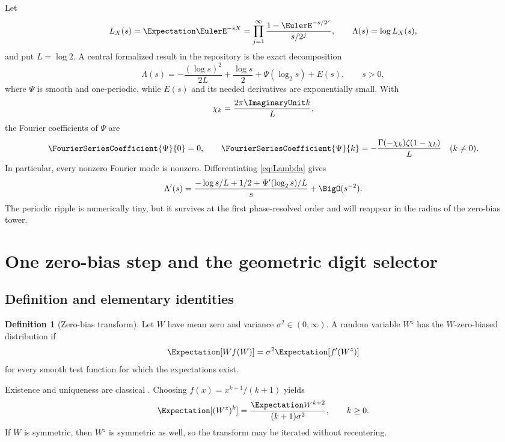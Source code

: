 \documentclass[11pt,oneside]{article}
\theoremstyle{definition}
\newtheorem{definition}[theorem]{Definition}
\theoremstyle{remark}
\begin{document}
Let
\begin{equation}
 L_X(s)=\Expectation\EulerE^{-sX}
 =\prod_{j=1}^{\infty}
   \frac{1-\EulerE^{-s/2^j}}{s/2^j},
 \qquad \Lambda(s)=\log L_X(s),                    \label{eq:LX}
\end{equation}
and put $L=\log2$.  A central formalized result in the repository is the exact
decomposition
\begin{equation}
 \Lambda(s)
 =-\frac{(\log s)^2}{2L}+\frac{\log s}{2}
   +\Psi(\log_2s)+E(s),\qquad s>0,                  \label{eq:Lambda}
\end{equation}
where $\Psi$ is smooth and one-periodic, while $E(s)$ and its needed
derivatives are exponentially small.  With
\begin{equation}
 \chi_k=\frac{2\pi\ImaginaryUnit k}{L},                        \label{eq:chi}
\end{equation}
the Fourier coefficients of $\Psi$ are
\begin{equation}
 \FourierSeriesCoefficient{\Psi}{0}=0,
 \qquad
 \FourierSeriesCoefficient{\Psi}{k}
 =-\frac{\Gamma(-\chi_k)\zeta(1-\chi_k)}{L}
 \quad(k\ne0).                                     \label{eq:Psi-Fourier}
\end{equation}
In particular, every nonzero Fourier mode is nonzero.  Differentiating
\eqref{eq:Lambda} gives
\begin{equation}
 \Lambda'(s)
 =\frac{-\log s/L+1/2+\Psi'(\log_2s)/L}{s}
  +\BigO(s^{-2}).                                   \label{eq:Lambda-prime}
\end{equation}
The periodic ripple is numerically tiny, but it survives at the first
phase-resolved order and will reappear in the radius of the zero-bias tower.

\section{One zero-bias step and the geometric digit selector}
\label{sec:one-step}

\subsection{Definition and elementary identities}

\begin{definition}[Zero-bias transform]
Let $W$ have mean zero and variance $\sigma^2\in(0,\infty)$.  A random variable
$W^z$ has the $W$-zero-biased distribution if
\begin{equation}
 \Expectation[Wf(W)]=\sigma^2\Expectation[f'(W^z)]                     \label{eq:zero-bias-def}
\end{equation}
for every smooth test function for which the expectations exist.
\end{definition}
Existence and uniqueness are classical \cite{goldsteinreinert1997}.  Choosing
$f(x)=x^{k+1}/(k+1)$ yields
\begin{equation}
 \Expectation[(W^z)^k]
 =\frac{\Expectation W^{k+2}}{(k+1)\sigma^2},
 \qquad k\ge0.                                     \label{eq:zero-bias-moments}
\end{equation}
If $W$ is symmetric, then $W^z$ is symmetric as well, so the transform may be
iterated without recentering.
\end{document}
